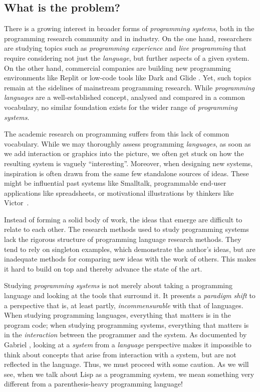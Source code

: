 \hypertarget{what-is-the-problem}{%
\subsection{What is the problem?}\label{what-is-the-problem}}

There is a growing interest in broader forms of \emph{programming
systems}, both in the programming research community and in industry. On
the one hand, researchers are studying topics such as \emph{programming
experience} and \emph{live programming} that require considering not
just the \emph{language}, but further aspects of a given system. On the
other hand, commercial companies are building new programming
environments like Replit \cite{ReplitWeb} or low-code tools like Dark
\cite{DarkWeb} and Glide \cite{GlideWeb}. Yet, such topics remain at the
sidelines of mainstream programming research. While \emph{programming
languages} are a well-established concept, analysed and compared in a
common vocabulary, no similar foundation exists for the wider range of
\emph{programming systems}.

The academic research on programming suffers from this lack of common
vocabulary. While we may thoroughly assess programming \emph{languages},
as soon as we add interaction or graphics into the picture, we often get
stuck on how the resulting system is vaguely ``interesting''. Moreover,
when designing new systems, inspiration is often drawn from the same few
standalone sources of ideas. These might be influential past systems
like Smalltalk, programmable end-user applications like spreadsheets, or
motivational illustrations by thinkers like Victor~\cite{BretVictor}.

Instead of forming a solid body of work, the ideas that emerge are
difficult to relate to each other. The research methods used to study
programming systems lack the rigorous structure of programming language
research methods. They tend to rely on singleton examples, which
demonstrate the author's ideas, but are inadequate methods for comparing
new ideas with the work of others. This makes it hard to build on top
and thereby advance the state of the art.

Studying \emph{programming systems} is not merely about taking a
programming language and looking at the tools that surround it. It
presents a \emph{paradigm shift} to a perspective that is, at least
partly, \emph{incommensurable} with that of languages. When studying
programming languages, everything that matters is in the program code;
when studying programming systems, everything that matters is in the
\emph{interaction} between the programmer and the system. As documented
by Gabriel \cite{PLrev}, looking at a \emph{system} from a
\emph{language} perspective makes it impossible to think about concepts
that arise from interaction with a system, but are not reflected in the
language. Thus, we must proceed with some caution. As we will see, when
we talk about Lisp as a programming system, we mean something very
different from a parenthesis-heavy programming language!

